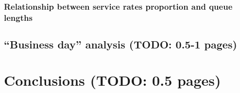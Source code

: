 \subsubsection{Relationship between service rates proportion and queue lengths}
\label{sec:cashier_no_infl}

\subsubsection{}

\subsection{``Business day'' analysis (TODO: 0.5-1 pages)}

\section{Conclusions (TODO: 0.5 pages)}
